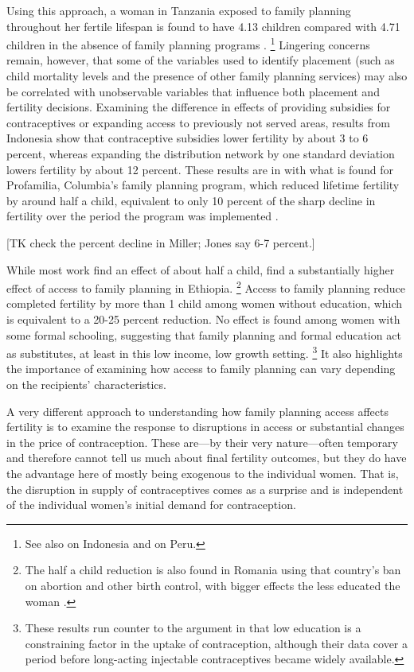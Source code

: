 \documentclass[letterpaper,12pt]{article}
\begin{document}
Using this approach, a woman in Tanzania exposed to family planning throughout 
her fertile lifespan is found to have 4.13 children compared with 4.71 children 
in the absence of family planning programs \citep{angeles98}.%
\footnote{
See also \citet{Angeles2005} on Indonesia and \citep{Angeles2005a} on Peru.
}
Lingering concerns remain, however, that some of the variables used to identify placement
(such as child mortality levels and the presence of other family planning services)
may also be correlated with unobservable variables that influence 
both placement and fertility decisions.
Examining the difference in effects of providing subsidies for contraceptives
or expanding access to previously not served areas, results from Indonesia
show that contraceptive subsidies lower fertility by about 3 to 6 percent,
whereas expanding the distribution network by one standard deviation 
lowers fertility by about 12 percent\citep{Molyneaux2000}.
These results are in with what is found for Profamilia, Columbia's family 
planning program, which reduced lifetime fertility by around 
half a child, equivalent to only 10 percent of the sharp decline in fertility 
over the period the program was implemented \citep{Miller2010}.

[TK check the percent decline in Miller; Jones say 6-7 percent.]


While most work find an effect of about half a child, \citet{Portner2011}
find a substantially higher effect of access to family planning in Ethiopia.%
\footnote{
The half a child reduction is also found in Romania using that country's 
ban on abortion and other birth control, with bigger effects the less
educated the woman \citep{Pop-Eleches2010}.
}
Access to family planning reduce completed fertility by more than 1 child among 
women without education, which is equivalent to a 20-25 percent reduction.
No effect is found among women with some formal schooling, suggesting that 
family planning and formal education act as 
substitutes, at least in this low income, low growth setting.%
\footnote{
These results run counter to the argument in \citet{Feyisetan1996}
that low education is a constraining factor in the uptake of contraception,
although their data cover a period before long-acting injectable
contraceptives became widely available.
}
It also highlights the importance of examining how access to family planning
can vary depending on the recipients' characteristics.

\citet{Debpuur2002}


A very different approach to understanding how family planning access
affects fertility is to examine the response to disruptions in access
or substantial changes in the price of contraception.
These are---by their very nature---often temporary and therefore
cannot tell us much about final fertility outcomes, but they do have
the advantage here of mostly being exogenous to the individual women.
That is, the disruption in supply of contraceptives comes as a
surprise and is independent of the individual women's initial
demand for contraception.
\end{document}
